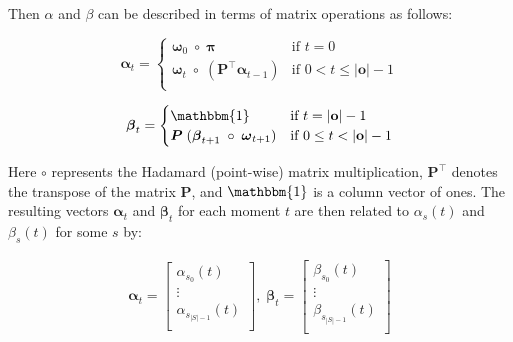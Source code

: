 Then $\alpha$ and $\beta$ can be described in terms of matrix operations as follows:

\begin{equation}
    \label{eq:alpha}
    \boldsymbol{\alpha}_t =
    \begin{cases}
        \boldsymbol{\omega}_0 \; \circ \; \boldsymbol{\pi}   & \text{if } t = 0          \\
        \boldsymbol{\omega}_t \; \circ \; \left( \boldsymbol{P}^\top \boldsymbol{\alpha}_{t - 1} \right)   & \text{if } 0 < t \leq |\mathbf{o}|-1 \\
    \end{cases}
\end{equation}


\begin{equation}
    \label{eq:beta}
    \boldsymbol{\beta}_t =
    \begin{cases}
        \mathbbm{1} & \text{if } t = |\mathbf{o}|-1        \\
        \boldsymbol{P} \; (\boldsymbol{\beta}_{t + 1} \; \circ \; \boldsymbol{\omega}_{t + 1}) & \text{if } 0 \leq t < |\mathbf{o}|-1 \\
    \end{cases}
\end{equation}

Here $\circ$ represents the Hadamard (point-wise) matrix multiplication, $\boldsymbol{P}^\top$ denotes the transpose of the matrix $\boldsymbol{P}$, and $\mathbbm{1}$ is a column vector of ones.
The resulting vectors $\boldsymbol{\alpha}_t$ and $\boldsymbol{\beta}_t$ for each moment $t$ are then related to $\alpha_s(t)$ and $\beta_s(t)$ for some $s$ by:

\begin{align}
    \boldsymbol{\alpha}_t = \begin{bmatrix}
                                \alpha_{s_0}(t)       \\
                                \vdots                \\
                                \alpha_{s_{|S|-1}}(t) \\
    \end{bmatrix}, \;
    \boldsymbol{\beta}_t = \begin{bmatrix}
                               \beta_{s_0}(t)       \\
                               \vdots               \\
                               \beta_{s_{|S|-1}}(t) \\
    \end{bmatrix}
\end{align}

